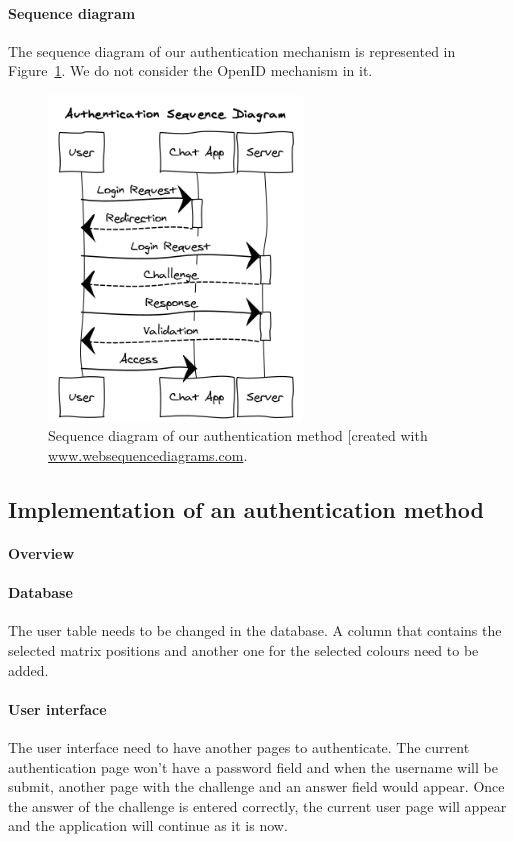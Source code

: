 \documentclass[11pt,a4paper]{article}
\begin{document}
\paragraph{Sequence diagram} The sequence diagram of our authentication mechanism is represented in Figure~\ref{fig:seqdia}. We do not consider the OpenID mechanism in it.
\begin{figure}
\centering
\includegraphics[width=0.6\textwidth]{seqdia.png}
\caption{Sequence diagram of our authentication method [created with \url{www.websequencediagrams.com}.}
\label{fig:seqdia}
\end{figure}

\subsection*{Implementation of an authentication method}
\paragraph{Overview}

\paragraph{Database}
The user table needs to be changed in the database. A column that contains the selected matrix positions and another
one for the selected colours need to be added.

\paragraph{User interface}
The user interface need to have another pages to authenticate. The current authentication page won't have a password
field and when the username will be submit, another page with the challenge and an answer field would appear. Once the
answer of the challenge is entered correctly, the current user page will appear and the application will continue as it
is now.
\end{document}
